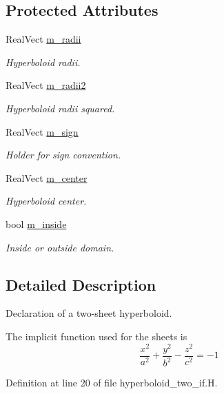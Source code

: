 \subsection*{Protected Attributes}
\begin{DoxyCompactItemize}
\item 
Real\+Vect \hyperlink{classhyperboloid__two__if_acb9460af1dd4d0b3fc53a7c128f49df6}{m\+\_\+radii}
\begin{DoxyCompactList}\small\item\em Hyperboloid radii. \end{DoxyCompactList}\item 
Real\+Vect \hyperlink{classhyperboloid__two__if_a9ac1a5e43471c84fb40e8158719d6d41}{m\+\_\+radii2}
\begin{DoxyCompactList}\small\item\em Hyperboloid radii squared. \end{DoxyCompactList}\item 
Real\+Vect \hyperlink{classhyperboloid__two__if_af60760b5d5371bdfa8a56eba172961f2}{m\+\_\+sign}
\begin{DoxyCompactList}\small\item\em Holder for sign convention. \end{DoxyCompactList}\item 
Real\+Vect \hyperlink{classhyperboloid__two__if_a302c23912c2a8e7445c261a7a5c9b047}{m\+\_\+center}
\begin{DoxyCompactList}\small\item\em Hyperboloid center. \end{DoxyCompactList}\item 
bool \hyperlink{classhyperboloid__two__if_a69d70f47d35b45026d3c9632404ea36e}{m\+\_\+inside}
\begin{DoxyCompactList}\small\item\em Inside or outside domain. \end{DoxyCompactList}\end{DoxyCompactItemize}


\subsection{Detailed Description}
Declaration of a two-\/sheet hyperboloid. 

The implicit function used for the sheets is \[ \frac{x^2}{a^2} + \frac{y^2}{b^2} - \frac{z^2}{c^2} = -1 \] 

Definition at line 20 of file hyperboloid\+\_\+two\+\_\+if.\+H.



